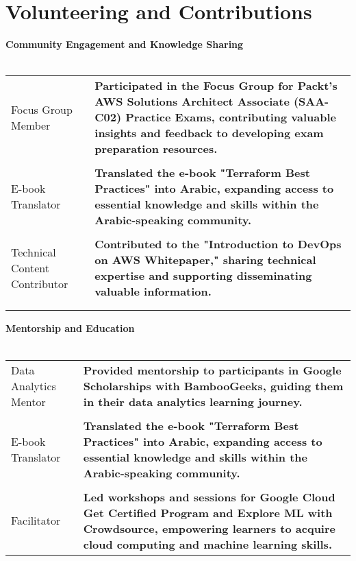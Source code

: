 \documentclass[a4paper,11pt]{article}
\begin{document}
\section{Volunteering and Contributions}


\textbf{Community Engagement and Knowledge Sharing} \\
\\
\begin{tabularx}{\linewidth}{@{}l X@{}}	
Focus Group Member & \textbf{Participated in the Focus Group for Packt's AWS Solutions Architect Associate (SAA-C02) Practice Exams, contributing valuable insights and feedback to developing exam preparation resources.}  \\
\\
E-book Translator & \textbf{Translated the e-book "Terraform Best Practices" into Arabic, expanding access to essential knowledge and skills within the Arabic-speaking community.}  \\ 
\\
Technical Content Contributor & \textbf{Contributed to the "Introduction to DevOps on AWS Whitepaper," sharing technical expertise and supporting disseminating valuable information.}  \\ 
\\
\\
\end{tabularx}

\textbf{Mentorship and Education} \\
\\
\begin{tabularx}{\linewidth}{@{}l X@{}}	
Data Analytics Mentor & \textbf{Provided mentorship to participants in Google Scholarships with BambooGeeks, guiding them in their data analytics learning journey.}  \\
\\
E-book Translator & \textbf{Translated the e-book "Terraform Best Practices" into Arabic, expanding access to essential knowledge and skills within the Arabic-speaking community.}  \\ 
\\
Facilitator & \textbf{Led workshops and sessions for Google Cloud Get Certified Program and Explore ML with Crowdsource, empowering learners to acquire cloud computing and machine learning skills.}  \\ 
\end{tabularx}
\end{document}

